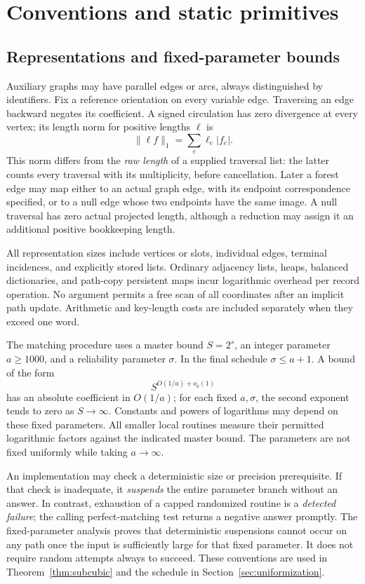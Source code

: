 \section{Conventions and static primitives}\label{sec:preliminaries}

\subsection{Representations and fixed-parameter bounds}

Auxiliary graphs may have parallel edges or arcs, always distinguished by
identifiers. Fix a reference orientation on every variable edge. Traversing
an edge backward negates its coefficient. A signed circulation has zero
divergence at every vertex; its length norm for positive lengths $\ell$ is
\[
                       \|\ell f\|_1=\sum_e\ell_e|f_e|.
\]
This norm differs from the \emph{raw length} of a supplied traversal list:
the latter counts every traversal with its multiplicity, before cancellation.
Later a forest edge may map either to an actual graph edge, with its endpoint
correspondence specified, or to a null edge whose two endpoints have the
same image. A null traversal has zero actual projected length, although a
reduction may assign it an additional positive bookkeeping length.

All representation sizes include vertices or slots, individual edges,
terminal incidences, and explicitly stored lists. Ordinary adjacency lists,
heaps, balanced dictionaries, and path-copy persistent maps incur logarithmic
overhead per record operation. No argument permits a free scan of all
coordinates after an implicit path update. Arithmetic and key-length costs
are included separately when they exceed one word.

The matching procedure uses a master bound $S=2^s$, an integer parameter
$a\ge1000$, and a reliability parameter $\sigma$. In the final schedule
$\sigma\le a+1$. A bound of the form
\[
                       S^{O(1/a)+o_a(1)}
\]
has an absolute coefficient in $O(1/a)$; for each fixed $a,\sigma$, the second
exponent tends to zero as $S\to\infty$. Constants and powers of logarithms
may depend on these fixed parameters. All smaller local routines measure
their permitted logarithmic factors against the indicated master bound.
The parameters are not fixed uniformly while taking $a\to\infty$.

An implementation may check a deterministic size or precision prerequisite.
If that check is inadequate, it \emph{suspends} the entire parameter branch
without an answer. In contrast, exhaustion of a capped randomized routine
is a \emph{detected failure}; the calling perfect-matching test returns a
negative answer promptly. The fixed-parameter analysis proves that
deterministic suspensions cannot occur on any path once the input is
sufficiently large for that fixed parameter. It does not require random
attempts always to succeed. These conventions are used in
Theorem~\ref{thm:subcubic} and the schedule in
Section~\ref{sec:uniformization}.


